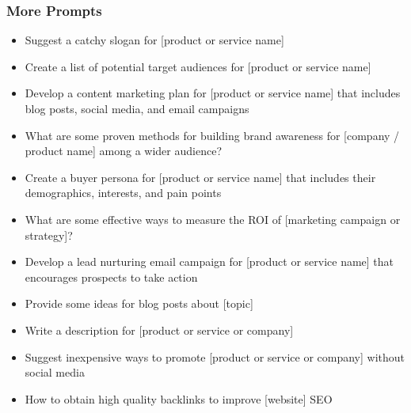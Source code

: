 \begin{frame}[fragile]\frametitle{More Prompts}
{\tiny 
\begin{itemize}
\item Suggest a catchy slogan for [product or service name]
\item Create a list of potential target audiences for [product or service name]
\item Develop a content marketing plan for [product or service name] that includes blog posts, social media, and email campaigns
\item What are some proven methods for building brand awareness for [company / product name] among a wider audience?
\item Create a buyer persona for [product or service name] that includes their demographics, interests, and pain points
\item What are some effective ways to measure the ROI of [marketing campaign or strategy]?
\item Develop a lead nurturing email campaign for [product or service name] that encourages prospects to take action
\item Provide some ideas for blog posts about [topic]
\item Write a description for [product or service or company]
\item Suggest inexpensive ways to promote [product or service or company] without social media
\item How to obtain high quality backlinks to improve [website] SEO
\end{itemize}
}
\end{frame}